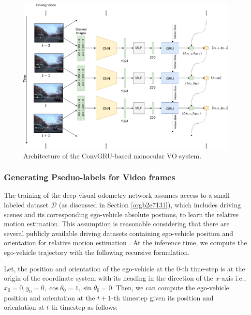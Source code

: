 \documentclass[letterpaper, 12pt]{book}
\theoremstyle{definition}
\theoremstyle{definition}
\theoremstyle{definition}
\theoremstyle{definition}
\theoremstyle{definition}
\begin{document}
\begin{figure}[H]
\centering
\includegraphics[keepaspectratio,width=\textwidth,height=\textheight]{./img/deepvo.pdf}
\caption{\label{fig:org8fe1c87}Architecture of the ConvGRU-based monocular VO system.}
\end{figure}

\subsubsection{Generating Pseduo-labels for Video frames}
\label{sec:org300232d}
The training of the deep visual odometry network assumes access to a small
labeled dataset \(\mathcal{D}\) (as discussed in Section \ref{orgb2e7131}), which includes driving
scenes and its corresponding ego-vehicle absolute postions, to learn the
relative motion estimation. This assumption is reasonable considering that there
are several publicly available driving datasets containing ego-vehicle position
and orientation for relative motion estimation
\cite{Geiger2012AreWR,Argoverse2}. At the inference time, we compute the
ego-vehicle trajectory with the following recursive formulation.

Let, the position and orientation of the ego-vehicle at the 0-th time-step is at
the origin of the coordinate system with its heading in the direction of the
\(x\)-axis i.e., \(x_{0}=0, y_{0}=0, \cos\theta_{0}=1, \sin\theta_{0}=0\). Then, we
can compute the ego-vehicle position and orientation at the \(t+1\)-th timestep
given its position and orientation at \(t\)-th timestep as follows:
\end{document}
